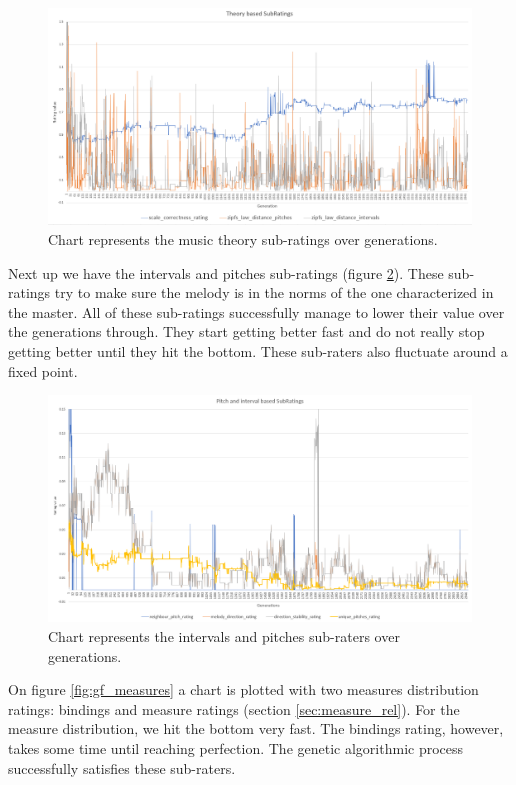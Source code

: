 \documentclass[a4paper]{article}
\begin{document}
\begin{figure}[H]
	\advance\leftskip-1.5cm
	\includegraphics[width=1.2\textwidth]{Fotos/results/gf/musical_rating_graph.png}
	\caption{Chart represents the music theory sub-ratings over generations.}
	\label{fig:gf_musical}
\end{figure}

Next up we have the intervals and pitches sub-ratings (figure \ref{fig:gf_interval}). These sub-ratings try to make sure the melody is in the norms of the one characterized in the master. All of these sub-ratings successfully manage to lower their value over the generations through. They start getting better fast and do not really stop getting better until they hit the bottom. These sub-raters also fluctuate around a fixed point.

\begin{figure}[H]
	\advance\leftskip-1.5cm
	\includegraphics[width=1.2\textwidth]{Fotos/results/gf/interval_rating_graph.png}
	\caption{Chart represents the intervals and pitches sub-raters over generations.}
	\label{fig:gf_interval}
\end{figure}

On figure \ref{fig:gf_measures} a chart is plotted with two measures distribution ratings: bindings and measure ratings (section \ref{sec:measure_rel}). For the measure distribution, we hit the bottom very fast. The bindings rating, however, takes some time until reaching perfection. The genetic algorithmic process successfully satisfies these sub-raters.
\end{document}
